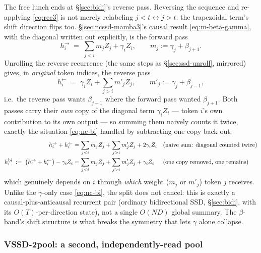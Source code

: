 \documentclass[11pt,a4paper]{article}
\begin{document}
The free lunch ends at \S\ref{sec:bidi}'s reverse pass. Reversing the
sequence and re-applying \eqref{eq:rec3} is not merely relabeling
$j<t\leftrightarrow j>t$: the trapezoidal term's shift direction
flips too. \S\ref{sec:ncssd-mamba3}'s causal result \eqref{eq:m-beta-gamma},
with the diagonal written out explicitly, is the forward pass
\begin{equation}\label{eq:m-beta-gamma-fwd}
  h_i^{\to} \;=\; \sum_{j<i} m_j Z_j + \gamma_i Z_i,
  \qquad m_j := \gamma_j + \beta_{j+1}.
\end{equation}
Unrolling the reverse recurrence (the same steps as
\S\ref{sec:ssd-unroll}, mirrored) gives, in \emph{original} token
indices, the reverse pass
\begin{equation}\label{eq:m-beta-gamma-rev}
  h_i^{\leftarrow} \;=\; \gamma_i Z_i + \sum_{j>i} m'_j Z_j,
  \qquad m'_j := \gamma_j + \beta_{j-1},
\end{equation}
i.e.\ the reverse pass wants $\beta_{j-1}$ where the forward pass wanted
$\beta_{j+1}$. Both passes carry their \emph{own} copy of the diagonal
term $\gamma_i Z_i$ --- token $i$'s own contribution to its own output
--- so summing them naively counts it twice, exactly the situation
\eqref{eq:nc-bi} handled by subtracting one copy back out:
\begin{align}
  h_i^{\to} + h_i^{\leftarrow}
    &= \sum_{j<i} m_j Z_j + \sum_{j>i} m'_j Z_j + 2\gamma_i Z_i
    &&\text{(naive sum: diagonal counted twice)} \notag\\
  h_i^{\text{bi}} \;:=\; \bigl(h_i^{\to} + h_i^{\leftarrow}\bigr) - \gamma_i Z_i
    &= \sum_{j<i} m_j Z_j + \sum_{j>i} m'_j Z_j + \gamma_i Z_i
    &&\text{(one copy removed, one remains)} \label{eq:m-beta-gamma-bi}
\end{align}
which genuinely depends on $i$ through \emph{which} weight ($m_j$ or
$m'_j$) token $j$ receives. Unlike the $\gamma$-only case
\eqref{eq:nc-bi}, the split does not cancel: this is exactly a
causal-plus-anticausal recurrent pair (ordinary bidirectional SSD,
\S\ref{sec:bidi}, with its $O(T)$-per-direction state), not a single
$O(ND)$ global summary. The $\beta$-band's shift structure is what
breaks the symmetry that lets $\gamma$ alone collapse.

\subsubsection{\texorpdfstring{VSSD-2pool}{VSSD-2pool}: a second, independently-read pool}
\end{document}
